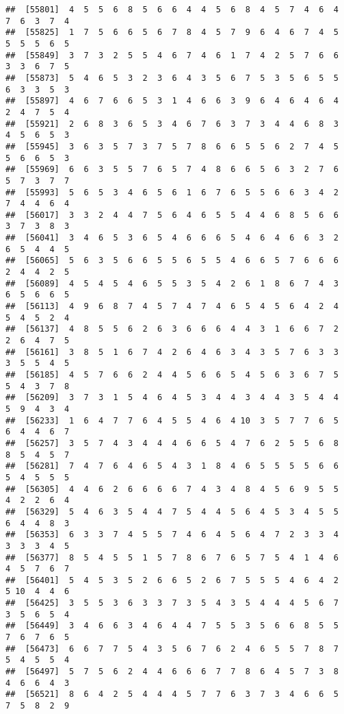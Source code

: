 \documentclass[
]{book}
\begin{document}
\begin{verbatim}
##  [55801]  4  5  5  6  8  5  6  6  4  4  5  6  8  4  5  7  4  6  4  7  6  3  7  4
##  [55825]  1  7  5  6  6  5  6  7  8  4  5  7  9  6  4  6  7  4  5  5  5  5  6  5
##  [55849]  3  7  3  2  5  5  4  6  7  4  6  1  7  4  2  5  7  6  6  3  3  6  7  5
##  [55873]  5  4  6  5  3  2  3  6  4  3  5  6  7  5  3  5  6  5  5  6  3  3  5  3
##  [55897]  4  6  7  6  6  5  3  1  4  6  6  3  9  6  4  6  4  6  4  2  4  7  5  4
##  [55921]  2  6  8  3  6  5  3  4  6  7  6  3  7  3  4  4  6  8  3  4  5  6  5  3
##  [55945]  3  6  3  5  7  3  7  5  7  8  6  6  5  5  6  2  7  4  5  5  6  6  5  3
##  [55969]  6  6  3  5  5  7  6  5  7  4  8  6  6  5  6  3  2  7  6  5  7  3  7  7
##  [55993]  5  6  5  3  4  6  5  6  1  6  7  6  5  5  6  6  3  4  2  7  4  4  6  4
##  [56017]  3  3  2  4  4  7  5  6  4  6  5  5  4  4  6  8  5  6  6  3  7  3  8  3
##  [56041]  3  4  6  5  3  6  5  4  6  6  6  5  4  6  4  6  6  3  2  6  5  4  4  5
##  [56065]  5  6  3  5  6  6  5  5  6  5  5  4  6  6  5  7  6  6  6  2  4  4  2  5
##  [56089]  4  5  4  5  4  6  5  5  3  5  4  2  6  1  8  6  7  4  3  6  5  6  6  5
##  [56113]  4  9  6  8  7  4  5  7  4  7  4  6  5  4  5  6  4  2  4  5  4  5  2  4
##  [56137]  4  8  5  5  6  2  6  3  6  6  6  4  4  3  1  6  6  7  2  2  6  4  7  5
##  [56161]  3  8  5  1  6  7  4  2  6  4  6  3  4  3  5  7  6  3  3  3  5  5  4  5
##  [56185]  4  5  7  6  6  2  4  4  5  6  6  5  4  5  6  3  6  7  5  5  4  3  7  8
##  [56209]  3  7  3  1  5  4  6  4  5  3  4  4  3  4  4  3  5  4  4  5  9  4  3  4
##  [56233]  1  6  4  7  7  6  4  5  5  4  6  4 10  3  5  7  7  6  5  6  4  4  6  7
##  [56257]  3  5  7  4  3  4  4  4  6  6  5  4  7  6  2  5  5  6  8  8  5  4  5  7
##  [56281]  7  4  7  6  4  6  5  4  3  1  8  4  6  5  5  5  5  6  6  5  4  5  5  5
##  [56305]  4  4  6  2  6  6  6  6  7  4  3  4  8  4  5  6  9  5  5  4  2  2  6  4
##  [56329]  5  4  6  3  5  4  4  7  5  4  4  5  6  4  5  3  4  5  5  6  4  4  8  3
##  [56353]  6  3  3  7  4  5  5  7  4  6  4  5  6  4  7  2  3  3  4  3  3  3  4  5
##  [56377]  8  5  4  5  5  1  5  7  8  6  7  6  5  7  5  4  1  4  6  4  5  7  6  7
##  [56401]  5  4  5  3  5  2  6  6  5  2  6  7  5  5  5  4  6  4  2  5 10  4  4  6
##  [56425]  3  5  5  3  6  3  3  7  3  5  4  3  5  4  4  4  5  6  7  3  5  6  5  4
##  [56449]  3  4  6  6  3  4  6  4  4  7  5  5  3  5  6  6  8  5  5  7  6  7  6  5
##  [56473]  6  6  7  7  5  4  3  5  6  7  6  2  4  6  5  5  7  8  7  5  4  5  5  4
##  [56497]  5  7  5  6  2  4  4  6  6  6  7  7  8  6  4  5  7  3  8  4  6  6  4  3
##  [56521]  8  6  4  2  5  4  4  4  5  7  7  6  3  7  3  4  6  6  5  7  5  8  2  9

\end{verbatim}
\end{document}
